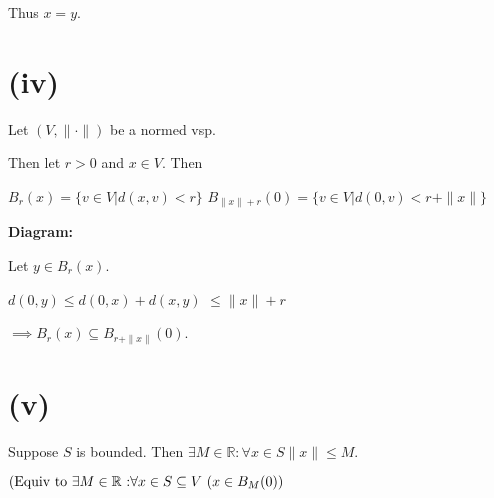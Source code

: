 \documentclass{article}
\theoremstyle{definition}
\numberwithin{equation}{section}
\begin{document}
Thus \( x = y \).

\section*{(iv)}

Let \( (V, \| \cdot \|) \) be a normed vsp.

Then let \( r > 0 \) and \( x \in V \). Then

$
B_{r}(x) = \{ v \in V | d(x, v) < r \}
$
$
B_{\| x \| + r}(0) = \{ v \in V | d(0, v) < r + \| x \| \}
$

\textbf{Diagram:}
\begin{center}
\end{center}

Let \( y \in B_r (x) \).

$
d(0, y) \leq d(0, x) + d(x, y)
$
$
\leq \| x \| + r
$

\(\implies B_r (x) \subseteq B_{r + \| x \|} (0) \).

\section*{(v)}
Suppose \( S \) is bounded. Then \(\exists M \in \mathbb{R} : \forall x \in S \| x \| \leq M \).

$
\text{(Equiv to } \exists M \in \mathbb{R} \text{ :} \forall x \in S \subseteq V\) \((x \in B_M (0))
$
\end{document}
